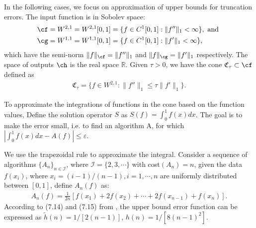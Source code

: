
\newcommand{\R}{\mathbb{R}}
In the following cases, we focus on approximation of upper bounds for truncation errors. The input function is in Sobolev space:
\begin{align*}
  \cf&=W^{2,1}=W^{2,1}[0,1]=\{f\in C^1[0,1]: \|f''\|_1<\infty\}, \text{ and }\\
  \cg&=W^{1,1}=W^{1,1}[0,1]=\{f\in C^1[0,1]: \|f'\|_1<\infty\},
\end{align*}
which have the semi-norm $\|f\|_{\cf}=\|f''\|_{1}$ and $\|f\|_{\cg}=\|f'\|_{1}$ respectively. The space of outputs $\ch$ is the real space $\R$. Given $\tau > 0$, we have the cone $\mathfrak{C}_{\tau} \subset \cf$ defined as
\begin{align}\label{coneinteg}
\mathfrak{C}_{\tau}=\{f\in W^{2,1}:\|f''\|_1\leq\tau\|f'\|_1\}.
\end{align}

To approximate the integrations of functions in the cone based on the function values, Define the solution operator $S$ as $S(f)=\int_{0}^{1}f(x)dx$. The goal is to make the error small, i.e. to find an algorithm A, for which $|\int_{0}^{1}f(x)dx-A(f)|\leq \varepsilon$.

We use the trapezoidal rule to approximate the integral. Consider a sequence of algorithms $\{A_n\}_{n\in \mathcal{I}}$, where $\mathcal{I}=\{2,3,\cdots\}$ with cost$(A_n)=n$, given the data $f(x_i)$, where $x_i=(i-1)/(n-1), i=1,\cdots,n$ are uniformly distributed between $[0,1]$, define $A_n(f)$ as: \begin{align*}
    A_{n}(f)%
    =\frac{1}{2n}[f(x_1)+2f(x_2)+\cdots+2f(x_{n-1})+f(x_n)].
\end{align*}
According to (7.14) and (7.15) from \cite{BraPet}, the upper bound error function can be expressed as $\tilde{h}(n)=1/[2(n-1)]$, $h(n)=1/[8(n-1)^2]$.
%
%
